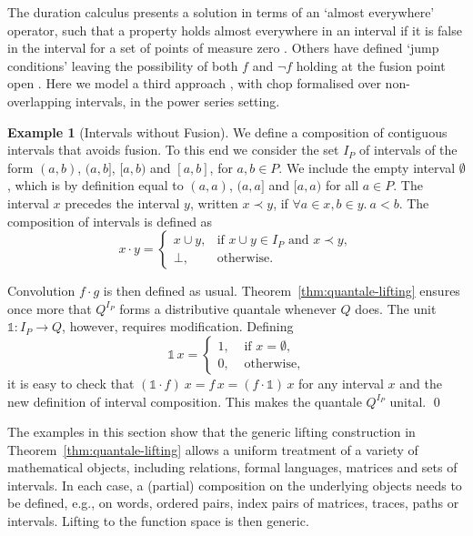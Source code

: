 \documentclass[12pt]{article}
\theoremstyle{definition}
\newtheorem{example}{Example}
\newcommand{\unit}{\mathbb{1}}
\begin{document}
The duration calculus presents a solution in terms of an `almost
everywhere' operator, such that a property holds almost everywhere in
an interval if it is false in the interval for a set of points of
measure zero \cite{ZH04}. Others have defined `jump conditions'
leaving the possibility of both $f$ and $\neg f$ holding at the fusion
point open \cite{HM09}.  Here we model a third approach \cite{DHD14},
with chop formalised over non-overlapping intervals, in the power
series setting.

\begin{example}[Intervals without Fusion]\label{ex:intervals-no-fusion}
  We define a composition of contiguous intervals that avoids
  fusion. To this end we consider the set $I_P$ of intervals of the
  form $(a,b)$, $(a,b]$, $[a,b)$ and $[a,b]$, for $a,b\in P$.
  We include the empty interval
  $\emptyset$, which is by definition equal to $(a,a)$, $(a,a]$ and
  $[a,a)$ for all $a\in P$.
  The interval $x$ precedes the interval $y$, written $x \prec y$,
  if $\forall a \in x, b \in y.\ a < b$.
  The composition of intervals is defined as
  \begin{equation*}
    x \cdot y =
      \begin{cases}
        x \cup y, & \text{if } x \cup y \in I_P \text{ and } x \prec y, \\
        \bot,       & \text{otherwise}.
      \end{cases}
\end{equation*}

  Convolution $f\cdot g$ is then defined as
  usual. Theorem~\ref{thm:quantale-lifting} ensures once more that
  $Q^{I_P}$ forms a distributive quantale whenever $Q$ does.  The unit
  $\unit :I_P\to Q$, however, requires modification. Defining
  \begin{equation*}
    \unit\, x = 
    \begin{cases}
      1, &\text{ if } x=\emptyset,\\
      0, &\text{ otherwise},
    \end{cases}
  \end{equation*}
  it is easy to check that $(\unit \cdot f)\ x = f\, x = (f\cdot
  \unit)\, x$ for any interval $x$ and the new definition of interval
  composition. This makes the quantale $Q^{I_P}$ unital. \qed
\end{example}

The examples in this section show that the generic lifting
construction in Theorem~\ref{thm:quantale-lifting} allows a uniform
treatment of a variety of mathematical objects, including relations,
formal languages, matrices and sets of intervals. In each case, a
(partial) composition on the underlying objects needs to be defined,
e.g., on words, ordered pairs, index pairs of matrices, traces, paths
or intervals. Lifting to the function space is then generic.
\end{document}
